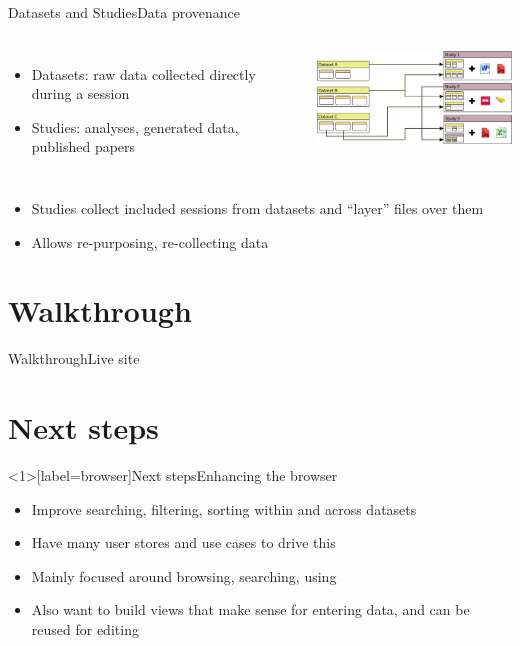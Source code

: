 \documentclass[aspectratio=169,14pt]{beamer}
\begin{document}
\begin{frame}{Datasets and Studies}{Data provenance}
	\begin{columns}
	\column{\textwidth-2.95in}
	\begin{itemize}
	\item Datasets: raw data collected directly during a session
	\item Studies: analyses, generated data, published papers
	\end{itemize}

	\column{2.5in}
	\includegraphics[width=2.5in]{studies.png}
	\end{columns}

	\begin{itemize}
	\item Studies collect included sessions from datasets and ``layer'' files over them
	\item Allows re-purposing, re-collecting data
	\end{itemize}
\end{frame}

\section{Walkthrough}

\begin{frame}{Walkthrough}{Live site}
\end{frame}

\section{Next steps}
\begin{frame}<1>[label=browser]{Next steps}{Enhancing the browser}
	\begin{itemize}
		\item<1> Improve searching, filtering, sorting within and across datasets
		\item<1> Have many user stores and use cases to drive this
		\item<2> Mainly focused around browsing, searching, using
		\item<2> Also want to build views that make sense for entering data, and can be reused for editing
	\end{itemize}
\end{frame}
\end{document}
